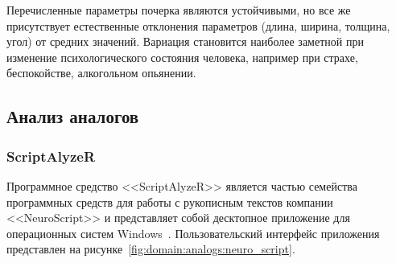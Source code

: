 Перечисленные параметры почерка являются устойчивыми, но все же присутствует естественные отклонения параметров (длина, ширина, толщина, угол) от средних значений. Вариация становится наиболее заметной при изменение психологического состояния человека, например при страхе, беспокойстве, алкогольном опьянении.

\subsection{Анализ аналогов}
\label{sub:domain:analogs}





\subsubsection{ScriptAlyzeR}
\label{sub:domain:analogs:neuro_script} 

Программное средство <<ScriptAlyzeR>> является частью семейства программных средств для работы с рукописным текстов компании <<NeuroScript>> и представляет собой десктопное приложение для операционных систем Windows~\cite{analogs_scriptAlyzer}. Пользовательский интерфейс приложения представлен на рисунке~\ref{fig:domain:analogs:neuro_script}.

